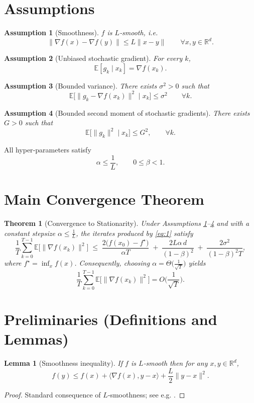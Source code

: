 \documentclass{article}
\newtheorem{theorem}{Theorem}
\newtheorem{lemma}{Lemma}
\newtheorem{assumption}{Assumption}
\newcommand{\E}{\mathbb{E}}
\newcommand{\R}{\mathbb{R}}
\begin{document}
\section*{Assumptions}
\begin{assumption}[Smoothness]\label{ass:smooth}
$f$ is $L$‑smooth, i.e.
\[
\|\nabla f(x)-\nabla f(y)\|\le L\|x-y\|\qquad\forall x,y\in\R^{d}.
\]
\end{assumption}
\begin{assumption}[Unbiased stochastic gradient]\label{ass:unbiased}
For every $k$, 
\[
\E[g_k\mid x_k]=\nabla f(x_k).
\]
\end{assumption}
\begin{assumption}[Bounded variance]\label{ass:variance}
There exists $\sigma^2>0$ such that
\[
\E\!\big[\|g_k-\nabla f(x_k)\|^{2}\mid x_k\big]\le\sigma^{2}\qquad\forall k.
\]
\end{assumption}
\begin{assumption}[Bounded second moment of stochastic gradients]\label{ass:bounded}
There exists $G>0$ such that
\[
\E\!\big[\|g_k\|^{2}\mid x_k\big]\le G^{2},\qquad\forall k.
\]
\end{assumption}
All hyper‑parameters satisfy
\[
\alpha\le\frac{1}{L},\qquad 0\le\beta<1.
\]

\section*{Main Convergence Theorem}
\begin{theorem}[Convergence to Stationarity]\label{thm:main}
Under Assumptions \ref{ass:smooth}–\ref{ass:bounded} and with a constant stepsize
$\alpha\le\frac{1}{L}$, the iterates produced by \eqref{eq:1} satisfy
\[
\frac{1}{T}\sum_{k=0}^{T-1}\E\big[\|\nabla f(x_k)\|^{2}\big]
\;\le\;
\frac{2\big(f(x_0)-f^{\star}\big)}{\alpha T}
\;+\;
\frac{2L\alpha\,d}{(1-\beta)^{2}}
\;+\;
\frac{2\sigma^{2}}{(1-\beta)^{2}T},
\tag{2}
\]
where $f^{\star}=\inf_{x}f(x)$. Consequently, choosing $\alpha=\Theta\big(\tfrac{1}{\sqrt{T}}\big)$ yields
\[
\frac{1}{T}\sum_{k=0}^{T-1}\E\big[\|\nabla f(x_k)\|^{2}\big]
=O\!\Big(\frac{1}{\sqrt{T}}\Big).
\]
\end{theorem}

\section*{Preliminaries (Definitions and Lemmas)}
\begin{lemma}[Smoothness inequality]\label{lem:smooth}
If $f$ is $L$‑smooth then for any $x,y\in\R^{d}$,
\[
f(y)\le f(x)+\langle\nabla f(x),y-x\rangle+\frac{L}{2}\|y-x\|^{2}.
\]
\end{lemma}
\begin{proof}
Standard consequence of $L$‑smoothness; see e.g. \cite{nesterov2004introductory}. \qedhere
\end{proof}
\end{document}
